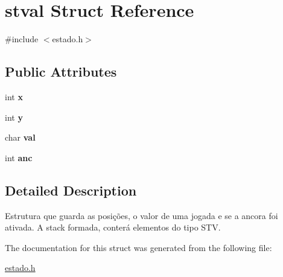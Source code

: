 \hypertarget{structstval}{\section{stval Struct Reference}
\label{structstval}
}


{\ttfamily \#include $<$estado.\+h$>$}

\subsection*{Public Attributes}
\begin{DoxyCompactItemize}
\item 
\hypertarget{structstval_ae72bc884ac53d88a51e642c3f8d58c77}{int {\bfseries x}}\label{structstval_ae72bc884ac53d88a51e642c3f8d58c77}

\item 
\hypertarget{structstval_a10adaa15c1ffc7acb9290602310afdc6}{int {\bfseries y}}\label{structstval_a10adaa15c1ffc7acb9290602310afdc6}

\item 
\hypertarget{structstval_a403eb2e2a268e849bcb61195fd50b1ca}{char {\bfseries val}}\label{structstval_a403eb2e2a268e849bcb61195fd50b1ca}

\item 
\hypertarget{structstval_a7c8464fa9d4a252798cac8c80857027a}{int {\bfseries anc}}\label{structstval_a7c8464fa9d4a252798cac8c80857027a}

\end{DoxyCompactItemize}


\subsection{Detailed Description}
Estrutura que guarda as posições, o valor de uma jogada e se a ancora foi ativada. A stack formada, conterá elementos do tipo S\+T\+V. 

The documentation for this struct was generated from the following file\+:\begin{DoxyCompactItemize}
\item 
\hyperlink{estado_8h}{estado.\+h}\end{DoxyCompactItemize}
